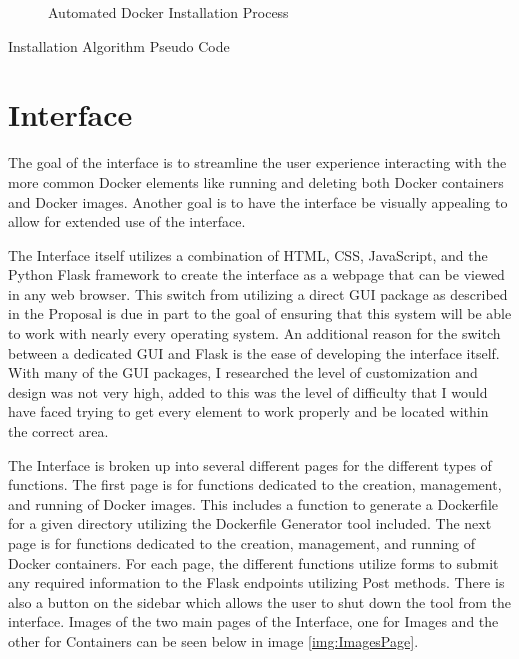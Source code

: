 \begin{figure}[h!]
  \centering
  
  \caption{Automated Docker Installation Process}
  \label{fig:install}
\end{figure}

\begin{algorithm}[H]
  
  \caption{Installation Algorithm Pseudo Code}
  \label{alg:install}
\end{algorithm}


\section{Interface}
\label{sec:interface}

The goal of the interface is to streamline the user experience interacting with the more common Docker elements like running and deleting both Docker containers and Docker images. Another goal is to have the interface be visually appealing to allow for extended use of the interface.

The Interface itself utilizes a combination of HTML, CSS, JavaScript, and the Python Flask \cite{flask} framework to create the interface as a webpage that can be viewed in any web browser. This switch from utilizing a direct GUI package as described in the Proposal is due in part to the goal of ensuring that this system will be able to work with nearly every operating system. An additional reason for the switch between a dedicated GUI and Flask is the ease of developing the interface itself. With many of the GUI packages, I researched the level of customization and design was not very high, added to this was the level of difficulty that I would have faced trying to get every element to work properly and be located within the correct area.

The Interface is broken up into several different pages for the different types of functions. The first page is for functions dedicated to the creation, management, and running of Docker images. This includes a function to generate a Dockerfile for a given directory utilizing the Dockerfile Generator tool included. The next page is for functions dedicated to the creation, management, and running of Docker containers. For each page, the different functions utilize forms to submit any required information to the Flask endpoints utilizing Post methods. There is also a button on the sidebar which allows the user to shut down the tool from the interface. Images of the two main pages of the Interface, one for Images and the other for Containers can be seen below in image \ref{img:ImagesPage}.

